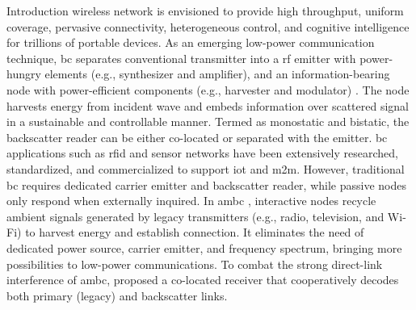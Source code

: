 \documentclass[journal]{IEEEtran}
\begin{document}
\glsresetall

\begin{section}{Introduction}
	 wireless network is envisioned to provide high throughput, uniform coverage, pervasive connectivity, heterogeneous control, and cognitive intelligence for trillions of portable devices.
	As an emerging low-power communication technique, \gls{bc} separates conventional transmitter into a \gls{rf} emitter with power-hungry elements (e.g., synthesizer and amplifier), and an information-bearing node with power-efficient components (e.g., harvester and modulator) \cite{Boyer2014}.
	The node harvests energy from incident wave and embeds information over scattered signal in a sustainable and controllable manner.
	Termed as monostatic and bistatic, the backscatter reader can be either co-located or separated with the emitter.
	\gls{bc} applications such as \gls{rfid} \cite{Dobkin2012,Landt2005} and sensor networks \cite{Vannucci2008,Assimonis2016} have been extensively researched, standardized, and commercialized to support \gls{iot} and \gls{m2m}.
	However, traditional \gls{bc} requires dedicated carrier emitter and backscatter reader, while passive nodes only respond when externally inquired.
	In \gls{ambc} \cite{Liu2013b}, interactive nodes recycle ambient signals generated by legacy transmitters (e.g., radio, television, and Wi-Fi) to harvest energy and establish connection.
	It eliminates the need of dedicated power source, carrier emitter, and frequency spectrum, bringing more possibilities to low-power communications.
	To combat the strong direct-link interference of \gls{ambc}, \cite{Yang2018} proposed a co-located receiver that cooperatively decodes both primary (legacy) and backscatter links.

\end{section}
\end{document}
